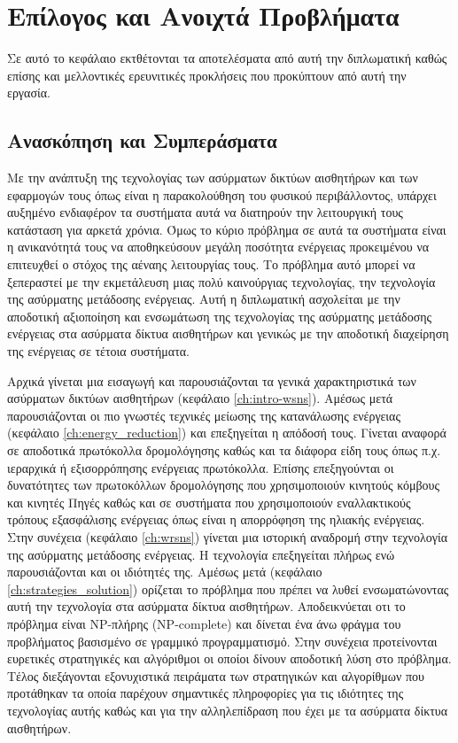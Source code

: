 

\chapter{Επίλογος και Ανοιχτά Προβλήματα}\label{ch:conclusion}
Σε αυτό το κεφάλαιο εκτθέτονται τα αποτελέσματα από αυτή την διπλωματική καθώς επίσης και μελλοντικές ερευνιτικές προκλήσεις που προκύπτουν από αυτή την εργασία.
\section{Ανασκόπηση και Συμπεράσματα}
Με την ανάπτυξη της τεχνολογίας των ασύρματων δικτύων αισθητήρων και των εφαρμογών τους όπως είναι η παρακολούθηση του φυσικού περιβάλλοντος, υπάρχει αυξημένο
ενδιαφέρον τα συστήματα αυτά να διατηρούν την λειτουργική τους κατάσταση για αρκετά χρόνια. Όμως το κύριο πρόβλημα σε αυτά τα συστήματα είναι η ανικανότητά τους
να αποθηκεύσουν μεγάλη ποσότητα ενέργειας προκειμένου να επιτευχθεί ο στόχος της αέναης λειτουργίας τους. Το πρόβλημα αυτό μπορεί να ξεπεραστεί με την εκμετάλευση
μιας πολύ καινούργιας τεχνολογίας, την τεχνολογία της ασύρματης μετάδοσης ενέργειας. Αυτή η διπλωματική ασχολείται με την αποδοτική αξιοποίηση και ενσωμάτωση της
τεχνολογίας της ασύρματης μετάδοσης ενέργειας στα ασύρματα δίκτυα αισθητήρων και γενικώς με την αποδοτική διαχείρηση της ενέργειας σε τέτοια συστήματα.

Αρχικά γίνεται μια εισαγωγή και παρουσιάζονται τα γενικά χαρακτηριστικά των ασύρματων δικτύων αισθητήρων (κεφάλαιο \ref{ch:intro-wsns}). Αμέσως μετά παρουσιάζονται οι
πιο γνωστές τεχνικές μείωσης της κατανάλωσης ενέργειας (κεφάλαιο \ref{ch:energy_reduction}) και επεξηγείται η απόδοσή τους. Γίνεται αναφορά σε αποδοτικά
πρωτόκολλα δρομολόγησης καθώς και τα διάφορα είδη τους όπως π.χ. ιεραρχικά ή εξισορρόπησης ενέργειας πρωτόκολλα. Επίσης επεξηγούνται οι δυνατότητες των πρωτοκόλλων
δρομολόγησης που χρησιμοποιούν κινητούς κόμβους και κινητές Πηγές καθώς και σε συστήματα που χρησιμοποιούν εναλλακτικούς τρόπους εξασφάλισης ενέργειας όπως είναι η
απορρόφηση της ηλιακής ενέργειας. Στην συνέχεια (κεφάλαιο \ref{ch:wrsns}) γίνεται μια ιστορική αναδρομή στην τεχνολογία της ασύρματης μετάδοσης ενέργειας. Η
τεχνολογία επεξηγείται πλήρως ενώ παρουσιάζονται και οι ιδιότητές της. Αμέσως μετά (κεφάλαιο \ref{ch:strategies_solution}) ορίζεται το πρόβλημα που πρέπει να λυθεί
ενσωματώνοντας αυτή την τεχνολογία στα ασύρματα δίκτυα αισθητήρων. Αποδεικνύεται οτι το πρόβλημα είναι NP-πλήρης (NP-complete) και δίνεται ένα άνω φράγμα του
προβλήματος βασισμένο σε γραμμικό προγραμματισμό. Στην συνέχεια προτείνονται ευρετικές στρατηγικές και αλγόριθμοι οι οποίοι δίνουν αποδοτική λύση στο πρόβλημα. Τέλος
διεξάγονται εξονυχιστικά πειράματα των στρατηγικών και αλγορίθμων που προτάθηκαν τα οποία παρέχουν σημαντικές πληροφορίες για τις ιδιότητες της τεχνολογίας αυτής
καθώς και για την αλληλεπίδραση που έχει με τα ασύρματα δίκτυα αισθητήρων.


